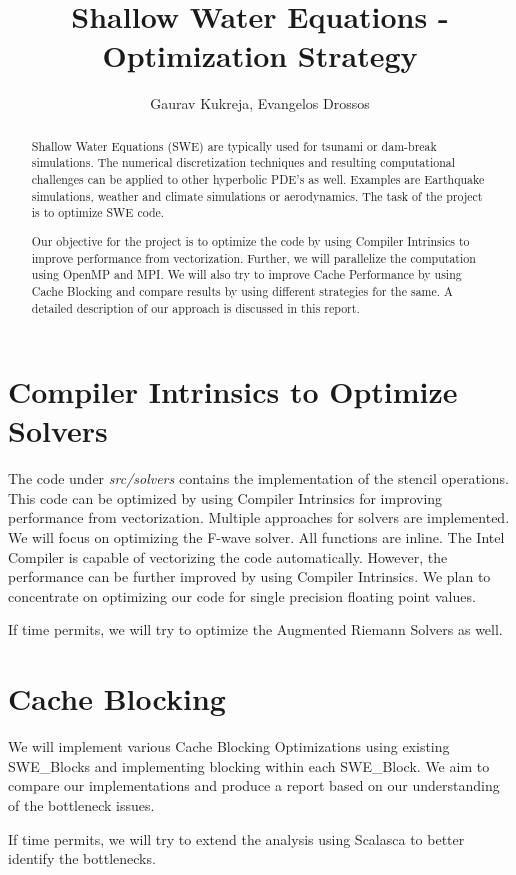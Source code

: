 \documentclass[]{article}
\title{Shallow Water Equations - Optimization Strategy}
\author{Gaurav Kukreja, Evangelos Drossos}
\begin{document}
\maketitle

\begin{abstract}
Shallow Water Equations (SWE) are typically used for tsunami or dam-break simulations.
The numerical discretization techniques and resulting computational challenges can be
applied to other hyperbolic PDE's as well. Examples are Earthquake simulations,
weather and climate simulations or aerodynamics. The task of the project is to optimize
SWE code. 

Our objective for the project is to optimize the code by using Compiler Intrinsics to
improve performance from vectorization. Further, we will parallelize the computation using
OpenMP and MPI. We will also try to improve Cache Performance by using Cache Blocking
and compare results by using different strategies for the same. A detailed description of
our approach is discussed in this report.
\end{abstract}

\section{Compiler Intrinsics to Optimize Solvers}
The code under \textit{src/solvers} contains the implementation of the stencil operations.
This code can be optimized by using Compiler Intrinsics for improving performance from vectorization.
Multiple approaches for solvers are implemented. We will focus on optimizing the 
F-wave solver. All functions are inline. The Intel Compiler is capable of vectorizing
the code automatically. However, the performance can be further improved by using Compiler
Intrinsics. We plan to concentrate on optimizing our code for single precision floating point values.

If time permits, we will try to optimize the Augmented Riemann Solvers as well.

\section{Cache Blocking}
We will implement various Cache Blocking Optimizations using existing SWE\_Blocks and
implementing blocking within each SWE\_Block. We aim to compare our implementations and
produce a report based on our understanding of the bottleneck issues.

If time permits, we will try to extend the analysis using Scalasca to better identify
the bottlenecks.
\end{document}
